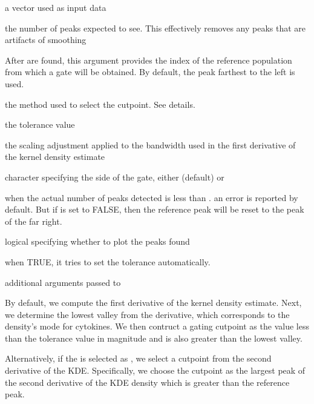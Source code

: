 \documentclass[letterpaper]{book}
\begin{document}
%
\begin{Arguments}
\begin{ldescription}
\item[\code{x}] a  vector used as input data

\item[\code{num\_peaks}] the number of peaks expected to see. This effectively removes
any peaks that are artifacts of smoothing

\item[\code{ref\_peak}] After  are found, this argument provides the
index of the reference population from which a gate will be obtained. By
default, the peak farthest to the left is used.

\item[\code{method}] the method used to select the cutpoint. See details.

\item[\code{tol}] the tolerance value

\item[\code{adjust}] the scaling adjustment applied to the bandwidth used in the
first derivative of the kernel density estimate

\item[\code{side}] character specifying the side of the gate, either
 (default) or 

\item[\code{strict}]  when the actual number of peaks detected is less than .
an error is reported by default. But if  is set to FALSE, then the reference peak will be reset to the peak of the far right.

\item[\code{plot}] logical specifying whether to plot the peaks found

\item[\code{auto\_tol}] when TRUE, it tries to set the tolerance automatically.

\item[\code{...}] additional arguments passed to 
\end{ldescription}
\end{Arguments}
%
\begin{Details}
By default, we compute the first derivative of the kernel density estimate.
Next, we determine the lowest valley from the derivative, which corresponds to the
density's mode for cytokines. We then contruct a gating cutpoint as the value
less than the tolerance value  in magnitude and is also greater
than the lowest valley.

Alternatively, if the  is selected as , we
select a cutpoint from the second derivative of the KDE. Specifically, we
choose the cutpoint as the largest peak of the second derivative of the KDE
density which is greater than the reference peak.
\end{Details}
\end{document}

